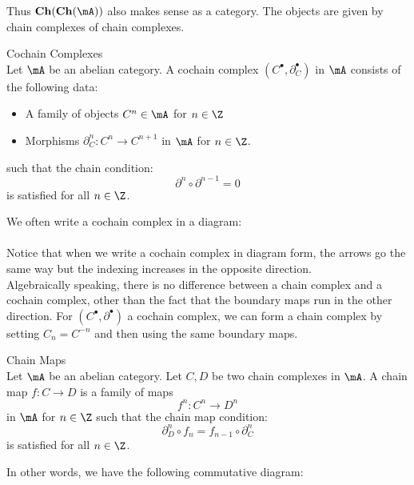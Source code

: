 \documentclass[a4paper]{article}
\begin{document}
Thus $\bold{Ch}(\bold{Ch}(\mA))$ also makes sense as a category. The objects are given by chain complexes of chain complexes. 

\begin{defn}{Cochain Complexes}{}\\
Let $\mA$ be an abelian category. A cochain complex $(C^\bullet,\partial_C^\bullet)$ in $\mA$ consists of the following data: 
\begin{itemize}
\item A family of objects $C^n\in\mA$ for $n\in\Z$
\item Morphisms $\partial_C^n:C^n\to C^{n+1}$ in $\mA$ for $n\in\Z$. 
\end{itemize}
such that the chain condition: $$\partial^n\circ\partial^{n-1}=0$$ is satisfied for all $n\in\Z$. 
\end{defn}

We often write a cochain complex in a diagram: \\
\\
Notice that when we write a cochain complex in diagram form, the arrows go the same way but the indexing increases in the opposite direction. \\

Algebraically speaking, there is no difference between a chain complex and a cochain complex, other than the fact that the boundary maps run in the other direction. For $(C^\bullet,\partial^\bullet)$ a cochain complex, we can form a chain complex by setting $C_n=C^{-n}$ and then using the same boundary maps. 

\begin{defn}{Chain Maps}{}\\
Let $\mA$ be an abelian category. Let $C,D$ be two chain complexes in $\mA$. A chain map $f:C\to D$ is a family of maps $$f^n:C^n\to D^n$$ in $\mA$ for $n\in\Z$ such that the chain map condition: $$\partial_D^n\circ f_n=f_{n-1}\circ\partial_C^n$$ is satisfied for all $n\in\Z$. 
\end{defn}

In other words, we have the following commutative diagram: \\
\end{document}
